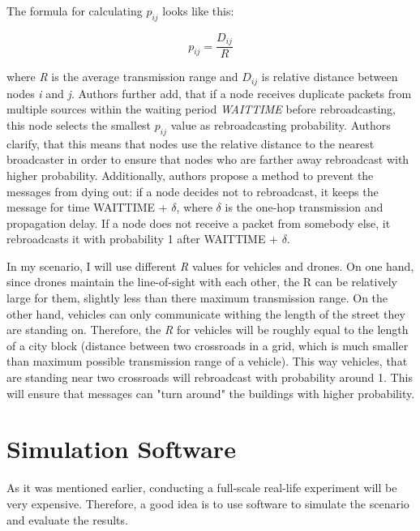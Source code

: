 \documentclass[]{nsm-thesis}
\begin{document}
The formula for calculating $p_{ij}$ looks like this:

\begin{equation}\label{eq:bs-p}
p_{ij} = \frac{D_{ij}}{R}
\end{equation}

where \emph{R} is the average transmission range and $D_{ij}$ is relative distance between nodes \emph{i} and \emph{j}. Authors further add, that if a node receives duplicate packets from multiple sources within the waiting period \emph{WAIT\textunderscore TIME} before rebroadcasting, this node selects the smallest $p_{ij}$ value as rebroadcasting probability. Authors clarify, that this means that nodes use the relative distance to the nearest broadcaster in order to ensure that nodes who are farther away rebroadcast with higher probability. Additionally, authors propose a method to prevent the messages from dying out: if a node decides not to rebroadcast, it keeps the message for time WAIT\textunderscore TIME + $\delta$, where $\delta$ is the one-hop transmission and propagation delay. If a node does not receive a packet from somebody else, it rebroadcasts it with probability 1 after WAIT\textunderscore TIME + $\delta$.

In my scenario, I will use different \emph{R} values for vehicles and drones. On one hand, since drones maintain the line-of-sight with each other, the R can be relatively large for them, slightly less than there maximum transmission range. On the other hand, vehicles can only communicate withing the length of the street they are standing on. Therefore, the \emph{R} for vehicles will be roughly equal to the length of a city block (distance between two crossroads in a grid, which is much smaller than maximum possible transmission range of a vehicle). This way vehicles, that are standing near two crossroads will rebroadcast with probability around 1. This will ensure that messages can "turn around" the buildings with higher probability.





\section {Simulation Software}

As it was mentioned earlier, conducting a full-scale real-life experiment will be very expensive. Therefore, a good idea is to use software to simulate the scenario and evaluate the results. 
\end{document}
